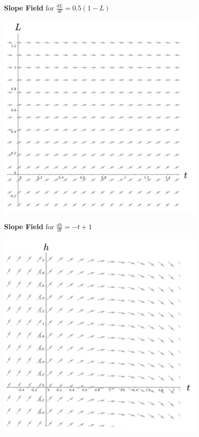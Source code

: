 \clearpage

\begin{center}
\textbf{Slope Field} for $\displaystyle\frac{dL}{dt} = 0.5(1 - L)$

\includegraphics[width=4in]{05/05SlopeField1.png}

\vspace{.5cm}
\textbf{Slope Field} for $\displaystyle\frac{dh}{dt} = -t + 1$

\includegraphics[width=4in]{05/05SlopeField2.png}\\
\end{center}

\clearpage

